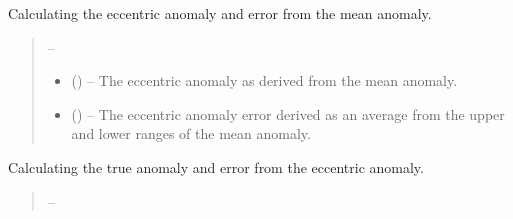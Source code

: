 \documentclass[letterpaper,11pt,english]{sphinxmanual}
\begin{document}
\begin{savenotes}
\begin{fulllineitems}
\begin{savenotes}\begin{fulllineitems}
\label{\detokenize{code/opihiexarata.orbit.solution:opihiexarata.orbit.solution.OrbitalSolution.__calculate_eccentric_anomaly}}
\pysigstartsignatures
{}
\pysigstopsignatures
\sphinxAtStartPar
Calculating the eccentric anomaly and error from the mean anomaly.
\begin{quote}\begin{description}
\sphinxAtStartPar
{} – 

\sphinxAtStartPar
\begin{itemize}
\item {} 
\sphinxAtStartPar
{} () – The eccentric anomaly as derived from the mean anomaly.

\item {} 
\sphinxAtStartPar
{} () – The eccentric anomaly error derived as an average from the upper
and lower ranges of the mean anomaly.

\end{itemize}


\end{description}\end{quote}

\end{fulllineitems}\end{savenotes}


\begin{savenotes}\begin{fulllineitems}
\label{\detokenize{code/opihiexarata.orbit.solution:opihiexarata.orbit.solution.OrbitalSolution.__calculate_true_anomaly}}
\pysigstartsignatures
{}
\pysigstopsignatures
\sphinxAtStartPar
Calculating the true anomaly and error from the eccentric anomaly.
\begin{quote}\begin{description}
\sphinxAtStartPar
{} – 


\end{description}
\end{quote}
\end{fulllineitems}
\end{savenotes}
\end{fulllineitems}
\end{savenotes}
\end{document}
